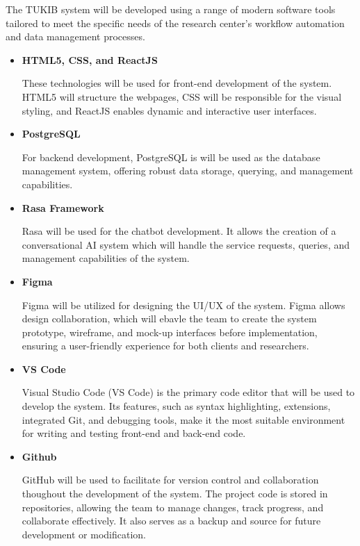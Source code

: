 The TUKIB system will be developed using a range of modern software tools tailored to meet the specific needs of the research center’s workflow automation and data management processes.

\begin{itemize}
	\item \textbf{HTML5, CSS, and ReactJS}
	
	These technologies will be used for front-end development of the system. HTML5 will structure the webpages, CSS will be responsible for the visual styling, and ReactJS enables dynamic and interactive user interfaces.\newline
	
	\item \textbf{PostgreSQL}
	
	For backend development, PostgreSQL is will be used as the database management system, offering robust data storage, querying, and management capabilities.\newline
	
	\item \textbf{Rasa Framework}
	
	Rasa will be used for the chatbot development. It allows the creation of a conversational AI system which will handle the service requests, queries, and management capabilities of the system.\newline
	
	\item \textbf{Figma}
	
	Figma will be utilized for designing the UI/UX of the system. Figma allows design collaboration, which will ebavle the team to create the system prototype, wireframe, and mock-up interfaces before implementation, ensuring a user-friendly experience for both clients and researchers.\newline
	
	\item \textbf{VS Code}
	
	Visual Studio Code (VS Code) is the primary code editor that will be used to develop the system. Its features, such as syntax highlighting, extensions, integrated Git, and debugging tools, make it the most suitable environment for writing and testing front-end and back-end code.\newline
	
	\item \textbf{Github}
	
	GitHub will be used to facilitate for version control and collaboration thoughout the development of the system. The project code is stored in repositories, allowing the team to manage changes, track progress, and collaborate effectively. It also serves as a backup and source for future development or modification.
	
\end{itemize}

